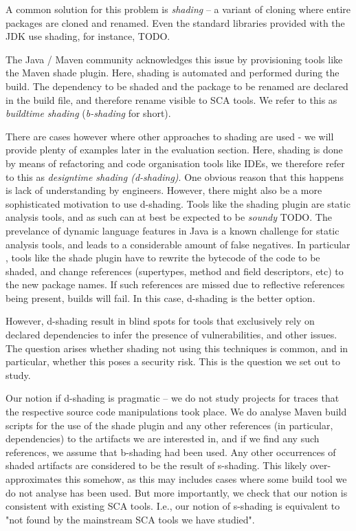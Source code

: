  A common solution for this problem is \textit{shading} -- a variant of cloning where entire packages are cloned and renamed. Even the standard libraries provided with the JDK use shading, for instance, TODO. 
 
 The Java / Maven community acknowledges this issue by provisioning tools like the Maven shade plugin. Here, shading is automated and performed during the build. The dependency to be shaded and the package to be renamed are declared in the build file, and therefore rename visible to SCA tools. We refer to this as \textit{buildtime shading} (\textit{b-shading} for short). 
 
 There are cases however where other approaches to shading are used - we will provide plenty of examples later in the evaluation section. Here, shading is done by means of refactoring and code organisation tools like IDEs, we therefore refer to this as \textit{designtime shading (d-shading)}. One obvious reason that this happens is lack of understanding by engineers.  However, there might also be a more sophisticated motivation to use d-shading. Tools like the shading plugin are static analysis tools, and as such can at best be expected to be \textit{soundy} TODO. The prevelance of dynamic language features in Java is a known challenge for static analysis tools, and leads to a considerable amount of false negatives. In particular , tools like the shade plugin have to rewrite the bytecode of the code to be shaded, and change references (supertypes, method and field descriptors, etc) to the new package names. If such references are missed due to reflective references being present, builds will fail. In this case, d-shading is the better option. 
 
 However, d-shading result in blind spots for tools that exclusively rely on declared dependencies to infer the presence of vulnerabilities, and other issues. The question arises whether shading not using this techniques is common, and in particular, whether this poses a security risk. This is the question we set out to study.  
 
 
 Our notion if d-shading is pragmatic -- we do not study projects for traces that the respective source code manipulations took place. We do  analyse Maven build scripts for the use of the shade plugin and any other references (in particular, dependencies) to the artifacts we are interested in, and if we find any such references, we assume that b-shading had been used.  Any other occurrences of shaded artifacts are considered to be the result of s-shading. This likely over-approximates this somehow, as this may includes cases where some build tool we do not analyse has been used. But more importantly, we check that our notion is consistent with existing SCA tools. I.e., our notion of s-shading is equivalent to "not found by the mainstream SCA tools we have studied". 
 
